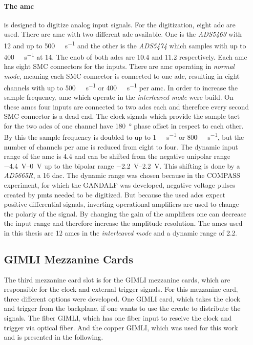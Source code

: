 \paragraph{The \ac{amc}} is designed to digitize analog input signals.
For the digitization, eight \ac{adc} are used.
There are \ac{amc} with two different \ac{adc} available.
One is the \textit{ADS5463} with \SI{12}{\bit} and up to \SI{500}{\mega\sample\per\second} and the other is the \textit{ADS5474} which samples with up to \SI{400}{\mega\sample\per\second} at \SI{14}{\bit}.
The \ac{enob} of both \acp{adc} are \SI{10.4}{\bit} and \SI{11.2}{\bit} respectively.
Each \ac{amc} has eight SMC connectors for the inputs.
There are \ac{amc} operating in \textit{normal mode}, meaning each SMC connector is connected to one \ac{adc}, resulting in eight channels with up to \SI{500}{\mega\sample\per\second} or \SI{400}{\mega\sample\per\second} per \ac{amc}.
In order to increase the sample frequency, \ac{amc} which operate in the \textit{interleaved mode} were build.
On these \acp{amc} four inputs are connected to two \ac{adc}s each and therefore every second SMC connector is a dead end.
The clock signals which provide the sample tact for the two \acp{adc} of one channel have \SI{180}{\degree} phase offset in respect to each other.
By this the sample frequency is doubled to up to \SI{1}{\giga\sample\per\second} or \SI{800}{\mega\sample\per\second}, but the number of channels per \ac{amc} is reduced from eight to four.
The dynamic input range of the \ac{amc} is \SI{4.4}{\vpp} and can be shifted from the negative unipolar range \SIrange{-4.4}{0}{\volt} up to the bipolar range \SIrange{-2.2}{2.2}{\volt}.
This shifting is done by a \textit{AD5665R}, a \SI{16}{\bit} \ac{dac}.
The dynamic range was chosen because in the COMPASS experiment, for which the GANDALF was developed, negative voltage pulses created by \acp{pmt} needed to be digitized.
But because the used \acp{adc} expect positive differential signals, inverting operational amplifiers are used to change the polariy of the signal.
By changing the gain of the amplifiers one can decrease the input range and therefore increase the amplitude resolution.
The \acp{amc} used in this thesis are \SI{12}{\bit} \acp{amc} in the \textit{interleaved mode} and a dynamic range of \SI{2.2}{\vpp}.


\subsection{GIMLI Mezzanine Cards}
The third mezzanine card slot is for the GIMLI mezzanine cards, which are responsible for the clock and external trigger signals.
For this mezzanine card, three different options were developed.
One GIMLI card, which takes the clock and trigger from the backplane, if one wants to use the create to distribute the signals.
The fiber GIMLI, which has one fiber input to reseive the clock and trigger via optical fiber.
And the copper GIMLI, which was used for this work and is presented in the following.

